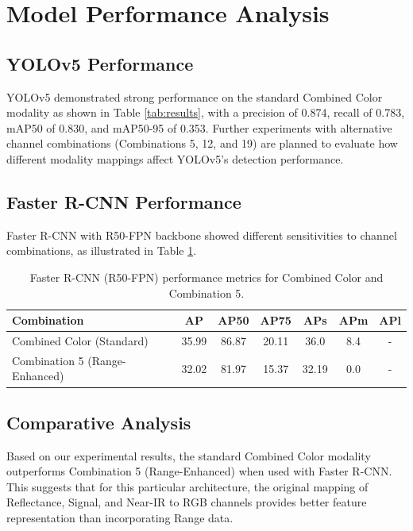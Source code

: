 \documentclass[11pt]{article}
\begin{document}
\section{Model Performance Analysis}
\label{appendix:model_performance}

\subsection{YOLOv5 Performance}
YOLOv5 demonstrated strong performance on the standard Combined Color modality as shown in Table \ref{tab:results}, with a precision of 0.874, recall of 0.783, mAP50 of 0.830, and mAP50-95 of 0.353. Further experiments with alternative channel combinations (Combinations 5, 12, and 19) are planned to evaluate how different modality mappings affect YOLOv5's detection performance.

\subsection{Faster R-CNN Performance}
Faster R-CNN with R50-FPN backbone showed different sensitivities to channel combinations, as illustrated in Table \ref{tab:rcnn_combination_results}.

\begin{table}[ht]
    \centering
    \caption{Faster R-CNN (R50-FPN) performance metrics for Combined Color and Combination 5.}
    \begin{tabular}{@{}lcccccc@{}}
    \toprule
    \textbf{Combination} & \textbf{AP} & \textbf{AP50} & \textbf{AP75} & \textbf{APs} & \textbf{APm} & \textbf{APl} \\ \midrule
    Combined Color (Standard) & 35.99 & 86.87 & 20.11 & 36.0 & 8.4 & - \\ 
    Combination 5 (Range-Enhanced) & 32.02 & 81.97 & 15.37 & 32.19 & 0.0 & - \\ \bottomrule
    \end{tabular}
    \label{tab:rcnn_combination_results}
\end{table}

\subsection{Comparative Analysis}
Based on our experimental results, the standard Combined Color modality outperforms Combination 5 (Range-Enhanced) when used with Faster R-CNN. This suggests that for this particular architecture, the original mapping of Reflectance, Signal, and Near-IR to RGB channels provides better feature representation than incorporating Range data.
\end{document}
